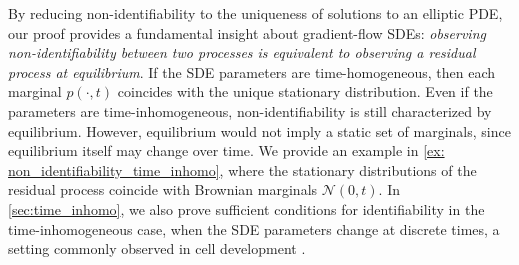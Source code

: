 \documentclass[twoside]{article}
\begin{document}
By reducing non-identifiability to the uniqueness of solutions to an elliptic PDE, our proof provides a fundamental insight about gradient-flow SDEs: \emph{observing non-identifiability between two processes is equivalent to observing a residual process at equilibrium}. %
If the SDE parameters are time-homogeneous, then each marginal $p(\cdot, t)$ coincides with the unique stationary distribution. Even if the parameters are time-inhomogeneous, non-identifiability is still characterized by equilibrium. However, equilibrium would not imply a static set of marginals, since equilibrium itself may change over time.
We provide an example in \cref{ex: non_identifiability_time_inhomo}, where the stationary distributions of the residual process coincide with Brownian marginals $\mathcal{N}(0,t)$. In \cref{sec:time_inhomo}, we also prove sufficient conditions for identifiability in the time-inhomogeneous case, when the SDE parameters change at discrete times, a setting commonly observed in cell development \citep{monnier2012bayesian}.


\end{document}
